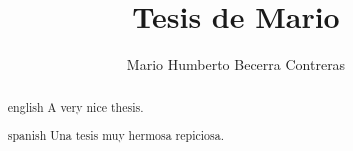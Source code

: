 \documentclass{docITAM}
\title{Tesis de Mario}
\author{Mario Humberto Becerra Contreras}
\begin{document}
	\npthousandsep{,}
	\maketitle
	\publicationrights


	
	


	\begin{abstract}{english}
		A very nice thesis.
	\end{abstract}

	\begin{abstract}{spanish}
		Una tesis muy hermosa repiciosa.
	\end{abstract}


	\setcounter{page}{1}

	\tableofcontents
	\listoffigures
	\listoftables
	\newpage

	\setcounter{page}{1}


	
	
	
	
	
	
	




	\appendix

	\clearpage



\begingroup
\raggedright
\sloppy
\printbibliography
\endgroup

\end{document}
